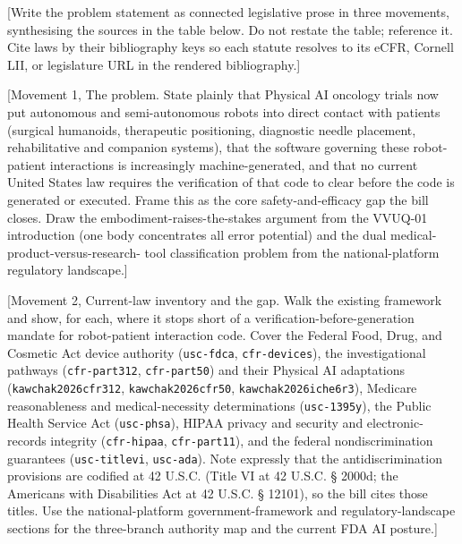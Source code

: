 
[Write the problem statement as connected legislative prose in three movements,
synthesising the sources in the table below. Do not restate the table; reference
it. Cite laws by their bibliography keys so each statute resolves to its eCFR,
Cornell LII, or legislature URL in the rendered bibliography.]

[Movement 1, The problem. State plainly that Physical AI oncology trials now put
autonomous and semi-autonomous robots into direct contact with patients (surgical
humanoids, therapeutic positioning, diagnostic needle placement, rehabilitative
and companion systems), that the software governing these robot-patient
interactions is increasingly machine-generated, and that no current United States
law requires the verification of that code to clear before the code is generated
or executed. Frame this as the core safety-and-efficacy gap the bill closes. Draw
the embodiment-raises-the-stakes argument from the VVUQ-01 introduction (one body
concentrates all error potential) and the dual medical-product-versus-research-
tool classification problem from the national-platform regulatory landscape.]

[Movement 2, Current-law inventory and the gap. Walk the existing framework and
show, for each, where it stops short of a verification-before-generation mandate
for robot-patient interaction code. Cover the Federal Food, Drug, and Cosmetic
Act device authority (\texttt{usc-fdca}, \texttt{cfr-devices}), the investigational
pathways (\texttt{cfr-part312}, \texttt{cfr-part50}) and their Physical AI
adaptations (\texttt{kawchak2026cfr312}, \texttt{kawchak2026cfr50},
\texttt{kawchak2026iche6r3}), Medicare reasonableness and medical-necessity
determinations (\texttt{usc-1395y}), the Public Health Service Act
(\texttt{usc-phsa}), HIPAA privacy and security and electronic-records integrity
(\texttt{cfr-hipaa}, \texttt{cfr-part11}), and the federal nondiscrimination
guarantees (\texttt{usc-titlevi}, \texttt{usc-ada}). Note expressly that the
antidiscrimination provisions are codified at 42 U.S.C. (Title VI at
42 U.S.C. § 2000d; the Americans with Disabilities Act at 42 U.S.C. § 12101), so
the bill cites those titles. Use the national-platform government-framework and
regulatory-landscape sections for the three-branch authority map and the current
FDA AI posture.]

